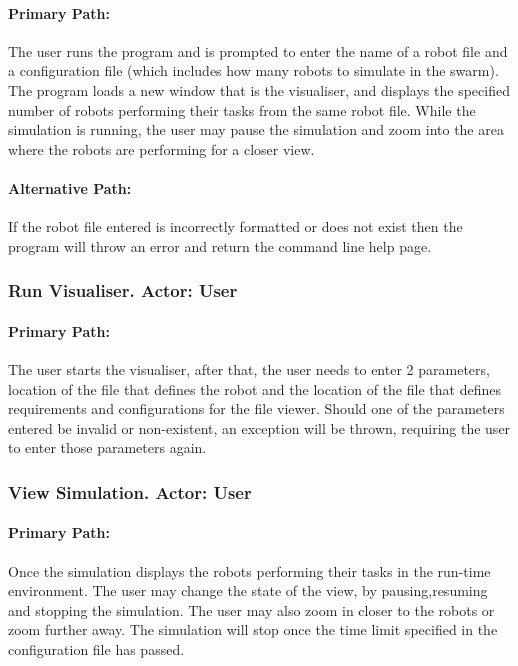 \documentclass[11pt,a4paper]{article}
\begin{document}
\paragraph{Primary Path:} The user runs the program and is prompted to enter
the name of a robot file and a configuration file (which includes how many
robots to simulate in the swarm).  The program loads a new window that is the
visualiser, and displays the specified number of robots performing their tasks
from the same robot file.  While the simulation is running, the user may pause
the simulation and zoom into the area where the robots are performing for a
closer view.

\paragraph{Alternative Path:} If the robot file entered is incorrectly
formatted or does not exist then the program will throw an error and return the
command line help page.

\subsubsection{ Run Visualiser. Actor: User}
\paragraph{Primary Path:} The user starts the visualiser, after that, the user
needs to enter 2 parameters, location of the file that defines the robot and
the location of the file that defines requirements and configurations for the
file viewer. Should one of the parameters entered be invalid or non-existent,
an exception will be thrown, requiring the user to enter those parameters
again.

\subsubsection{ View Simulation. Actor: User}
\paragraph{Primary Path:} Once the simulation displays the robots performing
their tasks in the run-time environment. The user may change the state of the
view, by pausing,resuming and stopping the simulation. The user may also zoom
in closer to the robots or zoom further away. The simulation will stop once the
time limit specified in the configuration file has passed.
\end{document}
